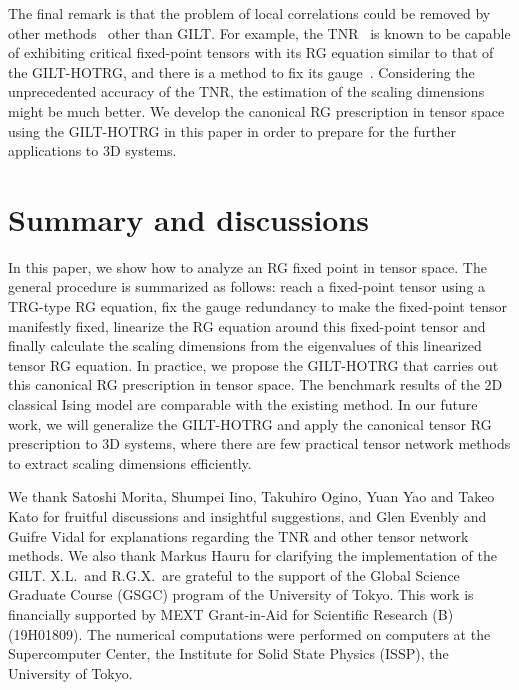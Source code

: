\documentclass[aps,prr,reprint,superscriptaddress,floatfix]{revtex4-2}
\begin{document}
The final remark is that the problem of local correlations could be removed by other methods~\cite{GuWen2009,tnr,tnralgo,tnrplus,looptnr,harada2018,fet,tns,tensor-ring} other than GILT.
For example, the TNR~\cite{tnr,tnralgo} is known to be capable of exhibiting critical fixed-point tensors with its RG equation similar to that of the GILT-HOTRG, and there is a method to fix its gauge~\cite{tnralgo}. 
Considering the unprecedented accuracy of the TNR, the estimation of the scaling dimensions might be much better.
We develop the canonical RG prescription in tensor space using the GILT-HOTRG in this paper in order to prepare for the further applications to 3D systems.
%


\section{Summary and discussions\label{conclusion}}
In this paper, we show how to analyze an RG fixed point in tensor space.
The general procedure is summarized as follows: reach a fixed-point tensor using a TRG-type RG equation, fix the gauge redundancy to make the fixed-point tensor manifestly fixed, linearize the RG equation around this fixed-point tensor and finally calculate the scaling dimensions from the eigenvalues of this linearized tensor RG equation.
In practice, we propose the GILT-HOTRG that carries out this canonical RG prescription in tensor space.
The benchmark results of the 2D classical Ising model are comparable with the existing method.
In our future work, we will generalize the GILT-HOTRG and apply the canonical tensor RG prescription to 3D systems, where there are few practical tensor network methods to extract scaling dimensions efficiently. 




\begin{acknowledgments}
We thank Satoshi Morita, Shumpei Iino, Takuhiro Ogino, Yuan Yao and Takeo Kato for fruitful discussions and insightful suggestions, and Glen Evenbly and Guifre Vidal for explanations regarding the TNR and other tensor network methods. 
We also thank Markus Hauru for clarifying the implementation of the GILT.
X.L.\ and R.G.X.\ are grateful to the support of the Global Science Graduate Course (GSGC) program of the University of Tokyo. 
This work is financially supported by MEXT Grant-in-Aid for Scientific Research (B) (19H01809).
The numerical computations were performed on computers at the Supercomputer Center, the Institute for Solid State Physics (ISSP), the University of Tokyo.

\end{acknowledgments}
\end{document}
